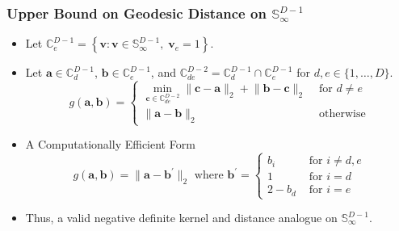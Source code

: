 \documentclass[aspectratio=169,10pt,notes]{beamer}
\begin{document}
\begin{frame}
    \frametitle{Upper Bound on Geodesic Distance on $\mathbb{S}_{\infty}^{D-1}$}
    \label{pgpareto:kerneldetails}
    \begin{itemize}
        \item Let $\mathbb{C}_e^{D-1} = \left\lbrace\bm{v} : \bm{v} \in 
            \mathbb{S}_{\infty}^{D-1},\;\bm{v}_e = 1\right\rbrace$.
        \item Let $\bm{a}\in \mathbb{C}_d^{D-1}$, $\bm{b}\in\mathbb{C}_e^{D-1}$, and
            $\mathbb{C}_{de}^{D-2} = \mathbb{C}_d^{D-1}\cap \mathbb{C}_e^{D-1}$
            for $d,e\in \lbrace 1,\ldots,D\rbrace$.
            \[
            g(\bm{a},\bm{b}) = \begin{cases}
                \min\limits_{\bm{c}\in\mathbb{C}_{de}^{D-2}}\lVert \bm{c} - \bm{a}\rVert_2 + 
                    \lVert \bm{b} - \bm{c}\rVert_2 &\text{ for }d\neq e\\
            \lVert \bm{a} - \bm{b}\rVert_2 &\text{ otherwise}
            \end{cases}
            \]
        \item A Computationally Efficient Form
        \[
            g(\bm{a},\bm{b}) = \lVert \bm{a} - \bm{b}^{\prime}\lVert_2 
            \text{ where }\bm{b}^{\prime} = \begin{cases}
                b_i &\text{ for }i\neq d,e\\
                1 &\text{ for }i = d\\
                2 - b_d &\text{ for }i = e
                \end{cases}
        \]
        \item Thus, a valid negative definite kernel and distance analogue on $\mathbb{S}_{\infty}^{D-1}$.
    \end{itemize}
    \hyperlink{pgpareto:energyscore}{}
\end{frame} %
\end{document}
